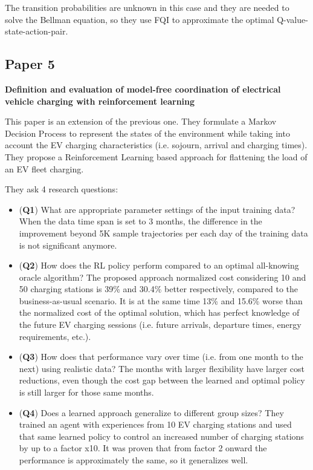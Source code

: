 The transition probabilities are unknown in this case and they are needed to solve the Bellman equation, so they use FQI to approximate the optimal Q-value-state-action-pair.

\subsection{Paper 5}
\textbf{Definition and evaluation of model-free coordination of electrical vehicle charging with reinforcement learning}

This paper is an extension of the previous one. They formulate a Markov Decision Process to represent the states of the environment while taking into account the EV charging characteristics (i.e. sojourn, arrival and charging times). They propose a Reinforcement Learning based approach for flattening the load of an EV fleet charging.

They ask 4 research questions:

\begin{itemize}
  \item (\textbf{Q1}) What are appropriate parameter settings of the input training data? When the data time span is set to 3 months, the difference in the improvement beyond 5K sample trajectories per each day of the training data is not significant anymore. 
  \item (\textbf{Q2}) How does the RL policy perform compared to an optimal all-knowing oracle algorithm? The proposed approach normalized cost considering 10 and 50 charging stations is 39\% and 30.4\% better respectively, compared to the business-as-usual scenario. It is at the same time 13\% and 15.6\% worse than the normalized cost of the optimal solution, which has perfect knowledge of the future EV charging sessions (i.e. future arrivals, departure times, energy requirements, etc.).
  \item (\textbf{Q3}) How does that performance vary over time (i.e. from one month to the next) using realistic data? The months with larger flexibility have larger cost reductions, even though the cost gap between the learned and optimal policy is still larger for those same months.
  \item (\textbf{Q4}) Does a learned approach generalize to different group sizes? They trained an agent with experiences from 10 EV charging stations and used that same learned policy to control an increased number of charging stations by up to a factor x10. It was proven that from factor 2 onward the performance is approximately the same, so it generalizes well.
\end{itemize}

